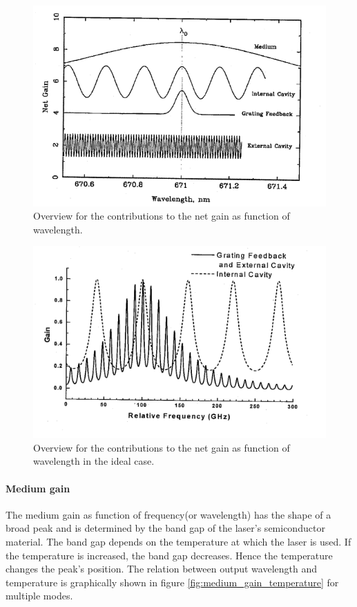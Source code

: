 \FloatBarrier
\begin{figure}
  \includegraphics[width=\textwidth]{gain_overview.png}
  \caption{Overview for the contributions to the net gain as function of
            wavelength.\cite{V60}}
  \label{fig:gain_overview}
\end{figure}
\FloatBarrier

\FloatBarrier
\begin{figure}
  \includegraphics[width=\textwidth]{ideal_gain_overview.png}
  \caption{Overview for the contributions to the net gain as function of
            wavelength in the ideal case.\cite{V60}}
  \label{fig:ideal_gain_overview}
\end{figure}
\FloatBarrier


\paragraph{Medium gain}
The medium gain as function of frequency(or wavelength) has
the shape of a broad peak and is determined by the band gap of
the laser's semiconductor material.
The band gap depends on the temperature at which the laser is used.
If the temperature is increased, the band gap decreases.
Hence the temperature changes the peak's position.
The relation between output wavelength and
temperature is graphically shown
in figure \ref{fig:medium_gain_temperature}
for multiple modes.



